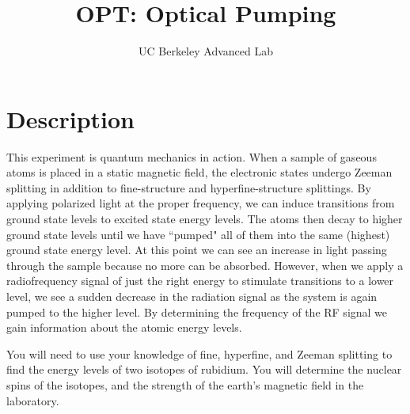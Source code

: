 \documentclass[11pt]{article}
\title{OPT: Optical Pumping}
\author{UC Berkeley Advanced Lab}
\date{}
\begin{document}
\maketitle
\section{Description}
This experiment is quantum mechanics in action. When a sample of gaseous atoms is placed in a static magnetic field, the electronic states undergo Zeeman splitting in addition to fine-structure and hyperfine-structure splittings. By applying polarized light at the proper frequency, we can induce transitions from ground state levels to excited state energy levels. The atoms then decay to higher ground state levels until we have ``pumped" all of them into the same (highest) ground state energy level. At this point we can see an increase in light passing through the sample because no more can be absorbed. However, when we apply a radiofrequency signal of just the right energy to stimulate transitions to a lower level, we see a sudden decrease in the radiation signal as the system is again pumped to the higher level. By determining the frequency of the RF signal we gain information about the atomic energy levels.

You will need to use your knowledge of fine, hyperfine, and Zeeman splitting to find the energy levels of two isotopes of rubidium. You will determine the nuclear spins of the isotopes, and the strength of the earth's magnetic field in the laboratory.

\begin{center}
\end{center}
\end{document}
